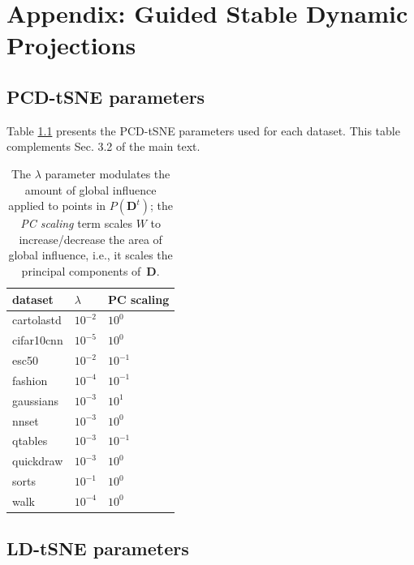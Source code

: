 
\chapter{Appendix: Guided Stable Dynamic Projections}

\section{PCD-tSNE parameters}

Table \ref{tab:pcd-params} presents the PCD-tSNE parameters used for each dataset. This table complements Sec. 3.2 of the main text. 

\begin{table}[h!]
  \centering
  \selectfont
  \scriptsize
  \begin{tabular}{|l|l|l|}
  \hline
  {dataset}    & {$\lambda$} & {PC scaling}        \\ \hline
  \hline
  cartolastd & $10^{-2}$ & $10^{0}$  \\ \hline
  cifar10cnn & $10^{-5}$ & $10^{0}$  \\ \hline
  esc50      & $10^{-2}$ & $10^{-1}$ \\ \hline
  fashion    & $10^{-4}$ & $10^{-1}$ \\ \hline
  gaussians  & $10^{-3}$ & $10^{1}$  \\ \hline
  nnset      & $10^{-3}$ & $10^{0}$  \\ \hline
  qtables    & $10^{-3}$ & $10^{-1}$ \\ \hline
  quickdraw  & $10^{-3}$ & $10^{0}$  \\ \hline
  sorts      & $10^{-1}$ & $10^{0}$  \\ \hline
  walk       & $10^{-4}$ & $10^{0}$  \\ \hline
  \end{tabular}
  \caption{The $\lambda$ parameter modulates the amount of global influence applied to points in $P(\mathbf{D}^t)$; the \emph{PC scaling} term scales $W$ to increase/decrease the area of global influence, i.e., it scales the principal components of \,$\mathbf{D}$.}
  \label{tab:pcd-params}
\end{table}

\section{LD-tSNE parameters}

